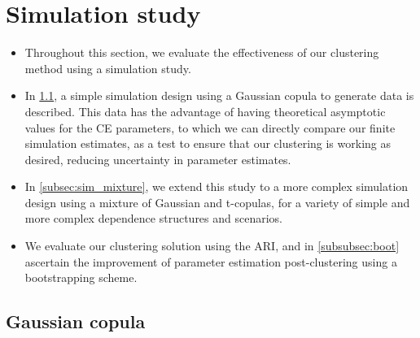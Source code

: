 \documentclass{article}
\numberwithin{equation}{section}
\begin{document}
\section{Simulation study}\label{sec:sim}

\begin{itemize}
  \item Throughout this section, we evaluate the effectiveness of our clustering method using a simulation study.
  \item In \ref{subsec:sim_gauss}, a simple simulation design using a Gaussian copula to generate data is described. 
  This data has the advantage of having theoretical asymptotic values for the CE parameters, to which we can directly compare our finite simulation estimates, as a test to ensure that our clustering is working as desired, reducing uncertainty in parameter estimates. 
  \item In \ref{subsec:sim_mixture}, we extend this study to a more complex simulation design using a mixture of Gaussian and t-copulas, for a variety of simple and more complex dependence structures and scenarios. 
  \item We evaluate our clustering solution using the ARI, and in \ref{subsubsec:boot} ascertain the improvement of parameter estimation post-clustering using a bootstrapping scheme. 
\end{itemize}

\subsection{Gaussian copula} \label{subsec:sim_gauss}
\end{document}
